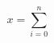 \documentclass[a4paper,11pt]{article}
\begin{document}
\begin{equation}
\displaystyle x  =  \sum _{i = 0} ^{n} 
\end{equation}
\end{document}
